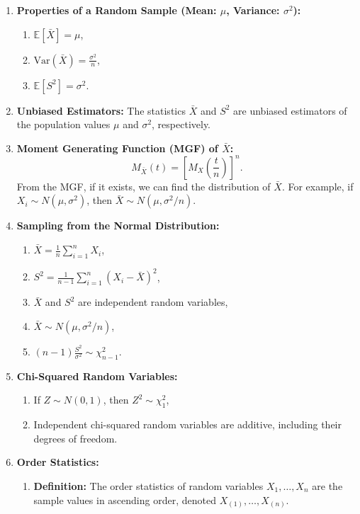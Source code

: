 \documentclass{article}
\begin{document}
\begin{enumerate}
    \item \textbf{Properties of a Random Sample (Mean: \(\mu\), Variance: \(\sigma^2\)):}
    \begin{enumerate}
        \item \(\mathbb{E}[\bar{X}] = \mu\),
        \item \(\text{Var}(\bar{X}) = \frac{\sigma^2}{n}\),
        \item \(\mathbb{E}[S^2] = \sigma^2\).
    \end{enumerate}

    \item \textbf{Unbiased Estimators:} The statistics \(\bar{X}\) and \(S^2\) are unbiased estimators of the population values \(\mu\) and \(\sigma^2\), respectively.

    \item \textbf{Moment Generating Function (MGF) of \(\bar{X}\):}
    \[
    M_{\bar{X}}(t) = \left[M_X\left(\frac{t}{n}\right)\right]^n.
    \]
    From the MGF, if it exists, we can find the distribution of \(\bar{X}\). For example, if \(X_i \sim N(\mu, \sigma^2)\), then \(\bar{X} \sim N(\mu, \sigma^2/n)\).

    \item \textbf{Sampling from the Normal Distribution:}
    \begin{enumerate}
        \item \(\bar{X} = \frac{1}{n} \sum_{i=1}^n X_i\),
        \item \(S^2 = \frac{1}{n-1} \sum_{i=1}^n (X_i - \bar{X})^2\),
        \item \(\bar{X}\) and \(S^2\) are independent random variables,
        \item \(\bar{X} \sim N(\mu, \sigma^2/n)\),
        \item \((n-1)\frac{S^2}{\sigma^2} \sim \chi^2_{n-1}\).
    \end{enumerate}

    \item \textbf{Chi-Squared Random Variables:}
    \begin{enumerate}
        \item If \(Z \sim N(0, 1)\), then \(Z^2 \sim \chi^2_1\),
        \item Independent chi-squared random variables are additive, including their degrees of freedom.
    \end{enumerate}

    \item \textbf{Order Statistics:}
    \begin{enumerate}
        \item \textbf{Definition:} The order statistics of random variables \(X_1, \dots, X_n\) are the sample values in ascending order, denoted \(X_{(1)}, \dots, X_{(n)}\).
    \end{enumerate}
\end{enumerate}
\end{document}
